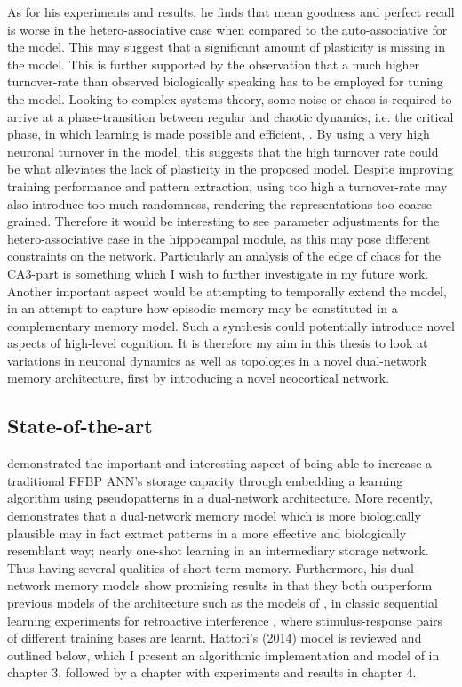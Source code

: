 As for his experiments and results, he finds that mean goodness and perfect recall is worse in the hetero-associative case when compared to the auto-associative for the model. This may suggest that a significant amount of plasticity is missing in the model. This is further supported by the observation that a much higher turnover-rate than observed biologically speaking has to be employed for tuning the model. Looking to complex systems theory, some noise or chaos is required to arrive at a phase-transition between regular and chaotic dynamics, i.e. the critical phase, in which learning is made possible and efficient, \cite{Langton1990, Newman2003}. By using a very high neuronal turnover in the model, this suggests that the high turnover rate could be what alleviates the lack of plasticity in the proposed model. Despite improving training performance and pattern extraction, using too high a turnover-rate may also introduce too much randomness, rendering the representations too coarse-grained. Therefore it would be interesting to see parameter adjustments for the hetero-associative case in the hippocampal module, as this may pose different constraints on the network. Particularly an analysis of the edge of chaos for the CA3-part is something which I wish to further investigate in my future work. Another important aspect would be attempting to temporally extend the model, in an attempt to capture how episodic memory may be constituted in a complementary memory model. Such a synthesis could potentially introduce novel aspects of high-level cognition. It is therefore my aim in this thesis to look at variations in neuronal dynamics as well as topologies in a novel dual-network memory architecture, first by introducing a novel neocortical network.

\subsection{State-of-the-art}

\cite{Ans1997} demonstrated the important and interesting aspect of being able to increase a traditional FFBP ANN's storage capacity through embedding a learning algorithm using pseudopatterns in a dual-network architecture. More recently, \cite{Hattori2010, Hattori2014} demonstrates that a dual-network memory model which is more biologically plausible may in fact extract patterns in a more effective and biologically resemblant way; nearly one-shot learning in an intermediary storage network. Thus having several qualities of short-term memory. Furthermore, his dual-network memory models show promising results in that they both outperform previous models of the architecture such as the models of \citep{French1997, Ans1997}, in classic sequential learning experiments for retroactive interference \citep{McCloskey1989}, where stimulus-response pairs of different training bases are learnt.
Hattori's (2014) model is reviewed and outlined below, which I present an algorithmic implementation and model of in chapter 3, followed by a chapter with experiments and results in chapter 4.

